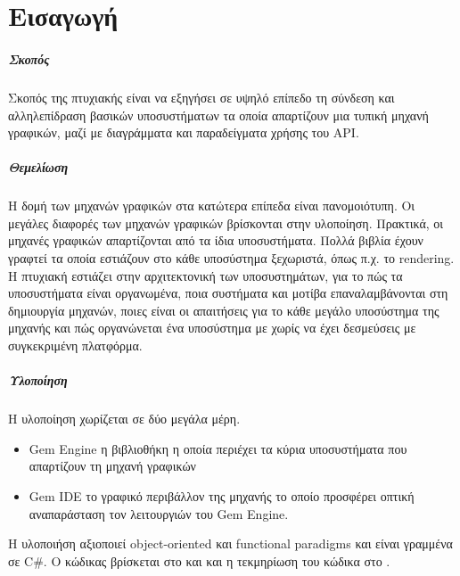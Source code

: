 \chapter{Εισαγωγή}
	\paragraph{Σκοπός}
	Σκοπός της πτυχιακής είναι να εξηγήσει σε υψηλό επίπεδο τη σύνδεση και αλληλεπίδραση βασικών υποσυστήματων τα οποία απαρτίζουν μια
	τυπική μηχανή γραφικών, μαζί με διαγράμματα και παραδείγματα χρήσης του \gls{API}. 
	
	\paragraph{Θεμελίωση} 	
	Η δομή των μηχανών γραφικών στα κατώτερα επίπεδα είναι πανομοιότυπη. Οι μεγάλες διαφορές των μηχανών γραφικών βρίσκονται στην υλοποίηση. Πρακτικά, οι μηχανές γραφικών απαρτίζονται από τα ίδια υποσυστήματα. Πολλά βιβλία έχουν γραφτεί τα οποία εστιάζουν στο κάθε υποσύστημα ξεχωριστά, όπως π.χ. το rendering.
	Η πτυχιακή εστιάζει στην αρχιτεκτονική των υποσυστημάτων, για το πώς τα υποσυστήματα είναι οργανωμένα, ποια συστήματα και μοτίβα επαναλαμβάνονται στη δημιουργία μηχανών, ποιες είναι οι απαιτήσεις για το κάθε μεγάλο υποσύστημα της μηχανής και πώς οργανώνεται ένα υποσύστημα με χωρίς να έχει δεσμεύσεις με συγκεκριμένη πλατφόρμα.

	\paragraph{Υλοποίηση}
	Η υλοποίηση χωρίζεται σε δύο μεγάλα μέρη.	
	\begin{itemize}
		\item {Gem Engine} η βιβλιοθήκη η οποία περιέχει τα κύρια υποσυστήματα που απαρτίζουν τη μηχανή γραφικών 
		\item {Gem IDE} το γραφικό περιβάλλον της μηχανής το οποίο προσφέρει οπτική αναπαράσταση τον λειτουργιών του Gem Engine.
	\end{itemize}
	H υλοποιήση αξιοποιεί object-oriented και functional paradigms και είναι γραμμένα σε C\#. Ο κώδικας βρίσκεται στο \cite{gem} και \cite{ginet} και η τεκμηρίωση του κώδικα στο \cite{gemDocs}.	
	

